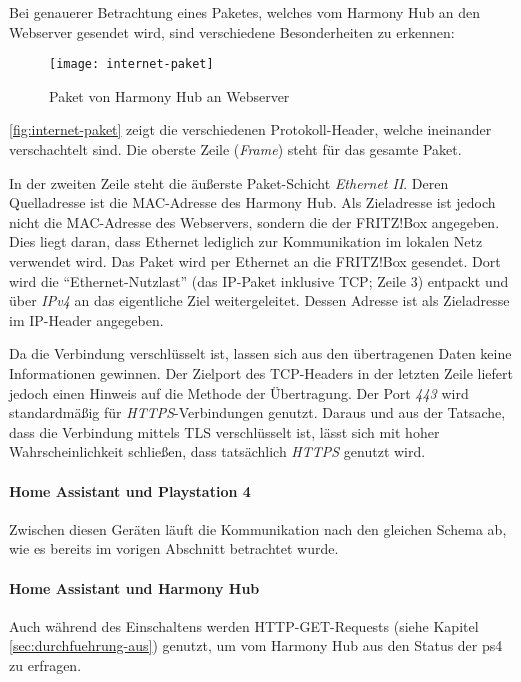 Bei genauerer Betrachtung eines Paketes, welches vom Harmony Hub an den Webserver gesendet wird,
sind verschiedene Besonderheiten zu erkennen:

\begin{figure}[h!]
    \centering
    \texttt{[image: internet-paket]}
    \caption{Paket von Harmony Hub an Webserver}\label{fig:internet-paket}
\end{figure}


\autoref{fig:internet-paket} zeigt die verschiedenen Protokoll-Header, welche ineinander verschachtelt sind.
Die oberste Zeile (\textit{Frame}) steht für das gesamte Paket.

In der zweiten Zeile steht die äußerste Paket-Schicht \textit{Ethernet II}.
Deren Quelladresse ist die MAC-Adresse des Harmony Hub.
Als Zieladresse ist jedoch nicht die MAC-Adresse des Webservers,
sondern die der FRITZ!Box angegeben.
Dies liegt daran, dass Ethernet lediglich zur Kommunikation im lokalen Netz verwendet wird.
Das Paket wird per Ethernet an die FRITZ!Box gesendet.
Dort wird die \enquote{Ethernet-Nutzlast} (das IP-Paket inklusive TCP; Zeile 3) entpackt und über \textit{IPv4} an das eigentliche Ziel weitergeleitet.
Dessen Adresse ist als Zieladresse im IP-Header angegeben.

Da die Verbindung verschlüsselt ist, lassen sich aus den übertragenen Daten keine Informationen gewinnen.
Der Zielport des TCP-Headers in der letzten Zeile liefert jedoch einen Hinweis auf die Methode der Übertragung.
Der Port \textit{443} wird standardmäßig für \textit{HTTPS}-Verbindungen genutzt.
Daraus und aus der Tatsache, dass die Verbindung mittels TLS verschlüsselt ist,
lässt sich mit hoher Wahrscheinlichkeit schließen, dass tatsächlich \textit{HTTPS} genutzt wird.

\paragraph{Home Assistant und Playstation 4}
Zwischen diesen Geräten läuft die Kommunikation nach den gleichen Schema ab,
wie es bereits im vorigen Abschnitt betrachtet wurde.

\paragraph{Home Assistant und Harmony Hub}
Auch während des Einschaltens werden HTTP-GET-Requests (siehe Kapitel \ref{sec:durchfuehrung-aus}) genutzt,
um vom Harmony Hub aus den Status der \ac{ps4} zu erfragen.

